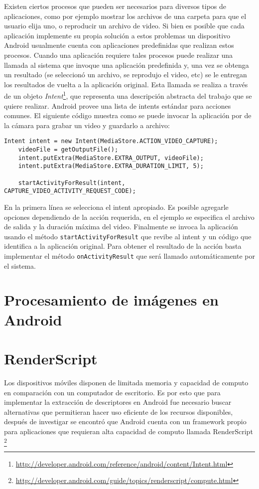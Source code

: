 Existen ciertos procesos que pueden ser necesarios para diversos tipos de aplicaciones, como por ejemplo mostrar los archivos de una carpeta para que el usuario elija uno, o reproducir un archivo de video. Si bien es posible que cada aplicación implemente su propia solución a estos problemas un dispositivo Android usualmente cuenta con aplicaciones predefinidas que realizan estos procesos. Cuando una aplicación requiere tales procesos puede realizar una llamada al sistema que invoque una aplicación predefinida y, una vez se obtenga un resultado (se seleccionó un archivo, se reprodujo el video, etc) se le entregan los resultados de vuelta a la aplicación original. Esta llamada se realiza a través de un objeto \emph{Intent}\footnote{\url{http://developer.android.com/reference/android/content/Intent.html}}, que representa una descripción abstracta del trabajo que se quiere realizar. Android provee una lista de intents estándar para acciones comunes. 
El siguiente código muestra como se puede invocar la aplicación por de la cámara para grabar un video y guardarlo a archivo:
\begin{lstlisting}[style=JavaInputStyle]
    Intent intent = new Intent(MediaStore.ACTION_VIDEO_CAPTURE);
    videoFile = getOutputFile();
    intent.putExtra(MediaStore.EXTRA_OUTPUT, videoFile);
    intent.putExtra(MediaStore.EXTRA_DURATION_LIMIT, 5);

    startActivityForResult(intent, CAPTURE_VIDEO_ACTIVITY_REQUEST_CODE);
\end{lstlisting}


En la primera línea se selecciona el intent apropiado. Es posible agregarle opciones dependiendo de la acción requerida, en el ejemplo se especifica el archivo de salida y la duración máxima del video. Finalmente se invoca la aplicación usando el método \texttt{startActivityForResult} que revibe al intent y un código que identifica a la aplicación original. Para obtener el resultado de la acción basta implementar el método \texttt{onActivityResult} que será llamado automáticamente por el sistema.  

\section*{Procesamiento de imágenes en Android}\label{img_proc}
\section{RenderScript}\label{renderscript}
Los dispositivos móviles disponen de limitada memoria y capacidad de computo en comparación con un computador de escritorio. Es por esto que para implementar la extracción de descriptores en Android fue necesario buscar alternativas que permitieran hacer uso eficiente de los recursos disponibles, después de investigar se encontró que Android cuenta con un framework propio para aplicaciones que requieran alta capacidad de computo llamada RenderScript \footnote{\url{http://developer.android.com/guide/topics/renderscript/compute.html}}

